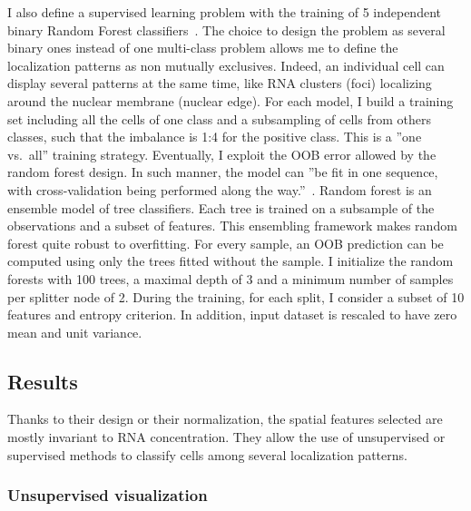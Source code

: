 I also define a supervised learning problem with the training of 5 independent binary Random Forest classifiers~\cite{breiman_random_2001}.
The choice to design the problem as several binary ones instead of one multi-class problem allows me to define the localization patterns as non mutually exclusives.
Indeed, an individual cell can display several patterns at the same time, like \ac{RNA} clusters (foci) localizing around the nuclear membrane (nuclear edge).
For each model, I build a training set including all the cells of one class and a subsampling of cells from others classes, such that the imbalance is 1:4 for the positive class.
This is a ''one vs.\ all'' training strategy.
Eventually, I exploit the \ac{OOB} error allowed by the random forest design.
In such manner, the model can ''be fit in one sequence, with cross-validation being performed along the way.''~\cite{hastie_elements_2009}.
Random forest is an ensemble model of tree classifiers.
Each tree is trained on a subsample of the observations and a subset of features.
This ensembling framework makes random forest quite robust to overfitting.
For every sample, an \ac{OOB} prediction can be computed using only the trees fitted without the sample.
I initialize the random forests with 100 trees, a maximal depth of 3 and a minimum number of samples per splitter node of 2.
During the training, for each split, I consider a subset of 10 features and entropy criterion.
In addition, input dataset is rescaled to have zero mean and unit variance.

\subsection{Results}
\label{subsec:results_general_pattern}

Thanks to their design or their normalization, the spatial features selected are mostly invariant to \ac{RNA} concentration.
They allow the use of unsupervised or supervised methods to classify cells among several localization patterns.

\subsubsection{Unsupervised visualization}

